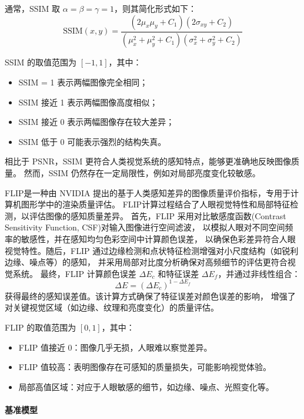 通常，SSIM 取 $\alpha = \beta = \gamma = 1$，则其简化形式如下：
\begin{equation}
    \text{SSIM}(x, y) = \frac{(2\mu_x\mu_y + C_1)(2\sigma_{xy} + C_2)}{(\mu_x^2 + \mu_y^2 + C_1)(\sigma_x^2 + \sigma_y^2 + C_2)}
\end{equation}

SSIM 的取值范围为 $[-1,1]$，其中：
\begin{itemize}
    \item SSIM = 1 表示两幅图像完全相同；
    \item SSIM 接近 1 表示两幅图像高度相似；
    \item SSIM 接近 0 表示两幅图像存在较大差异；
    \item SSIM 低于 0 可能表示强烈的结构失真。
\end{itemize}

相比于 PSNR，SSIM 更符合人类视觉系统的感知特点，能够更准确地反映图像质量。
然而，SSIM 仍然存在一定局限性，例如对局部亮度变化较敏感。

FLIP是一种由 NVIDIA 提出的基于人类感知差异的图像质量评价指标，专用于计算机图形学中的渲染质量评估。
FLIP计算过程结合了人眼视觉特性和局部特征检测，以评估图像的感知质量差异。
首先，FLIP 采用对比敏感度函数(Contrast Sensitivity Function, CSF)对输入图像进行空间滤波，
以模拟人眼对不同空间频率的敏感性，并在感知均匀色彩空间中计算颜色误差，
以确保色彩差异符合人眼视觉特性。随后，FLIP 通过边缘检测和点状特征检测增强对小尺度结构（如锐利边缘、噪点等）的感知，
并采用局部对比度分析确保对高频细节的评估更符合视觉系统。
最终，FLIP 计算颜色误差 $\Delta E_c$ 和特征误差 $\Delta E_f$，并通过非线性组合：
\begin{equation}
    \Delta E = (\Delta E_c)^{1 - \Delta E_f}
\end{equation}
获得最终的感知误差值。该计算方式确保了特征误差对颜色误差的影响，
增强了对关键视觉区域（如边缘、纹理和亮度变化）的质量评估。

FLIP 的取值范围为 $[0,1]$，其中：
\begin{itemize}
    \item FLIP 值接近 0：图像几乎无损，人眼难以察觉差异。
    \item FLIP 值较高：表明图像存在可感知的质量损失，可能影响视觉体验。
    \item 局部高值区域：对应于人眼敏感的细节，如边缘、噪点、光照变化等。
\end{itemize}

\paragraph{基准模型}

